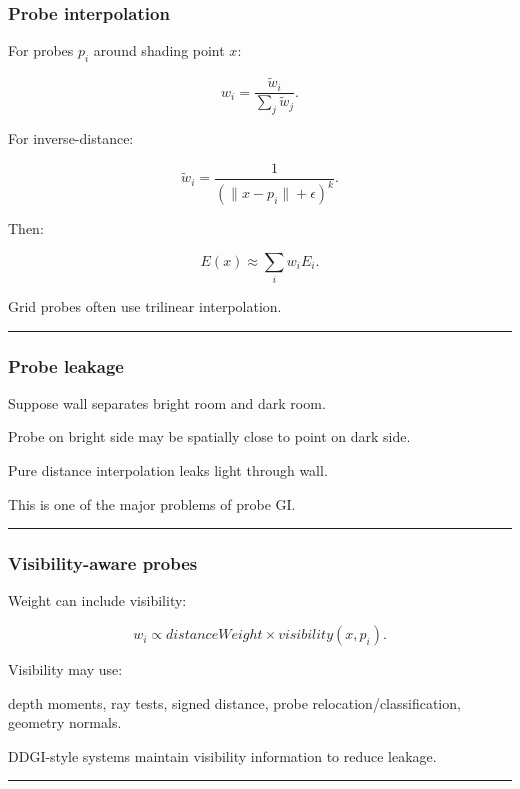 \subsubsection{Probe interpolation}\label{probe-interpolation}

For probes \(p_i\) around shading point \(x\):

\[
w_i=
\frac{
\tilde w_i
}{
\sum_j\tilde w_j
}.
\]

For inverse-distance:

\[
\tilde w_i=
\frac1{
(\|x-p_i\|+\epsilon)^k
}.
\]

Then:

\[
\boxed{
E(x)
\approx
\sum_iw_iE_i.
}
\]

Grid probes often use trilinear interpolation.

\begin{center}\rule{0.5\linewidth}{0.5pt}\end{center}

\subsubsection{Probe leakage}\label{probe-leakage}

Suppose wall separates bright room and dark room.

Probe on bright side may be spatially close to point on dark side.

Pure distance interpolation leaks light through wall.

This is one of the major problems of probe GI.

\begin{center}\rule{0.5\linewidth}{0.5pt}\end{center}

\subsubsection{Visibility-aware probes}\label{visibility-aware-probes}

Weight can include visibility:

\[
w_i
\propto
distanceWeight
\times
visibility(x,p_i).
\]

Visibility may use:

depth moments, ray tests, signed distance, probe relocation/classification, geometry normals.

DDGI-style systems maintain visibility information to reduce leakage.

\begin{center}\rule{0.5\linewidth}{0.5pt}\end{center}

